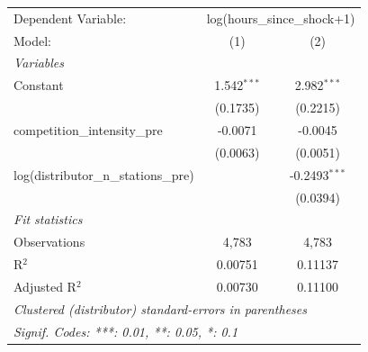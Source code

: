 
\begingroup
\centering
\begin{tabular}{lcc}
   \tabularnewline \midrule \midrule
   Dependent Variable: & \multicolumn{2}{c}{log(hours\_since\_shock+1)}\\
   Model:                                & (1)           & (2)\\  
   \midrule
   \emph{Variables}\\
   Constant                              & 1.542$^{***}$ & 2.982$^{***}$\\   
                                         & (0.1735)      & (0.2215)\\   
   competition\_intensity\_pre           & -0.0071       & -0.0045\\   
                                         & (0.0063)      & (0.0051)\\   
   log(distributor\_n\_stations\_pre)    &               & -0.2493$^{***}$\\   
                                         &               & (0.0394)\\   
   \midrule
   \emph{Fit statistics}\\
   Observations                          & 4,783         & 4,783\\  
   R$^2$                                 & 0.00751       & 0.11137\\  
   Adjusted R$^2$                        & 0.00730       & 0.11100\\  
   \midrule \midrule
   \multicolumn{3}{l}{\emph{Clustered (distributor) standard-errors in parentheses}}\\
   \multicolumn{3}{l}{\emph{Signif. Codes: ***: 0.01, **: 0.05, *: 0.1}}\\
\end{tabular}
\par\endgroup


